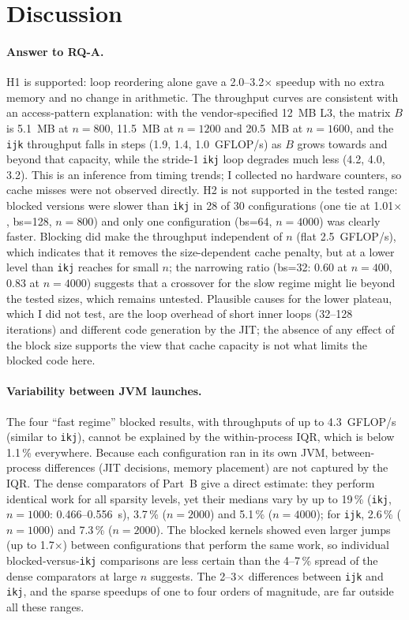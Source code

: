 \documentclass[11pt,a4paper]{article}
\begin{document}
\section{Discussion}\label{sec:disc}
\paragraph{Answer to RQ-A.} H1 is supported: loop reordering alone gave a 2.0--3.2$\times$ speedup with no extra memory and no change in arithmetic. The throughput curves are consistent with an access-pattern explanation: with the vendor-specified 12~MB L3, the matrix $B$ is 5.1~MB at $n=800$, 11.5~MB at $n=1200$ and 20.5~MB at $n=1600$, and the \texttt{ijk} throughput falls in steps (1.9, 1.4, 1.0~GFLOP/s) as $B$ grows towards and beyond that capacity, while the stride-1 \texttt{ikj} loop degrades much less (4.2, 4.0, 3.2). This is an inference from timing trends; I collected no hardware counters, so cache misses were not observed directly. H2 is not supported in the tested range: blocked versions were slower than \texttt{ikj} in 28 of 30 configurations (one tie at 1.01$\times$, bs=128, $n=800$) and only one configuration (bs=64, $n=4000$) was clearly faster. Blocking did make the throughput independent of $n$ (flat 2.5~GFLOP/s), which indicates that it removes the size-dependent cache penalty, but at a lower level than \texttt{ikj} reaches for small $n$; the narrowing ratio (bs=32: 0.60 at $n=400$, 0.83 at $n=4000$) suggests that a crossover for the slow regime might lie beyond the tested sizes, which remains untested. Plausible causes for the lower plateau, which I did not test, are the loop overhead of short inner loops (32--128 iterations) and different code generation by the JIT; the absence of any effect of the block size supports the view that cache capacity is not what limits the blocked code here.
\paragraph{Variability between JVM launches.} The four ``fast regime'' blocked results, with throughputs of up to 4.3~GFLOP/s (similar to \texttt{ikj}), cannot be explained by the within-process IQR, which is below 1.1\,\% everywhere. Because each configuration ran in its own JVM, between-process differences (JIT decisions, memory placement) are not captured by the IQR. The dense comparators of Part~B give a direct estimate: they perform identical work for all sparsity levels, yet their medians vary by up to 19\,\% (\texttt{ikj}, $n=1000$: 0.466--0.556~s), 3.7\,\% ($n=2000$) and 5.1\,\% ($n=4000$); for \texttt{ijk}, 2.6\,\% ($n=1000$) and 7.3\,\% ($n=2000$). The blocked kernels showed even larger jumps (up to 1.7$\times$) between configurations that perform the same work, so individual blocked-versus-\texttt{ikj} comparisons are less certain than the 4--7\,\% spread of the dense comparators at large $n$ suggests. The 2--3$\times$ differences between \texttt{ijk} and \texttt{ikj}, and the sparse speedups of one to four orders of magnitude, are far outside all these ranges.
\end{document}
